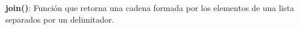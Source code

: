 
\question \textbf{join()}: Función que retorna una cadena formada por los
          elementos de una lista separados por un delimitador.
